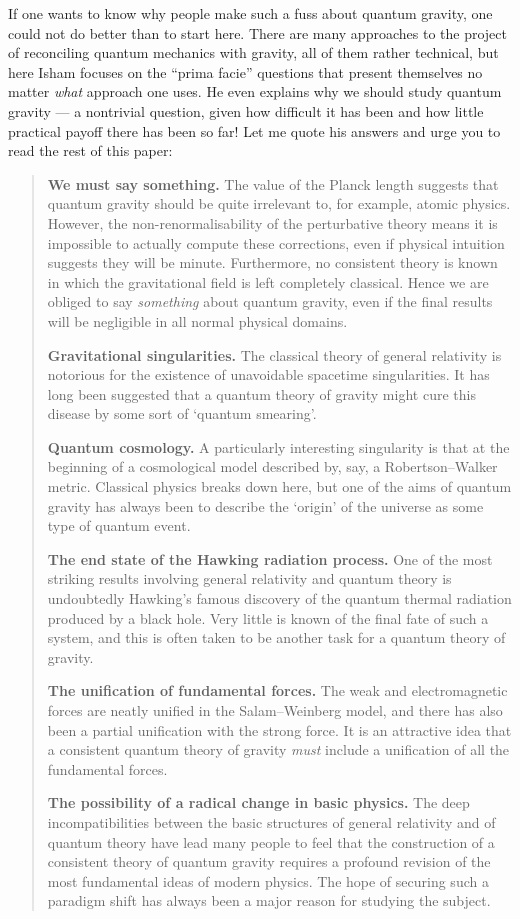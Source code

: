 \documentclass[12pt]{article}
\begin{document}
If one wants to know why people make such a fuss about quantum gravity,
one could not do better than to start here. There are many approaches to
the project of reconciling quantum mechanics with gravity, all of them
rather technical, but here Isham focuses on the ``prima facie''
questions that present themselves no matter \emph{what} approach one
uses. He even explains why we should study quantum gravity --- a
nontrivial question, given how difficult it has been and how little
practical payoff there has been so far! Let me quote his answers and
urge you to read the rest of this paper:

\begin{quote}

\textbf{We must say something.} The value of the Planck length suggests
that quantum gravity should be quite irrelevant to, for example, atomic
physics. However, the non-renormalisability of the perturbative theory
means it is impossible to actually compute these corrections, even if
physical intuition suggests they will be minute. Furthermore, no
consistent theory is known in which the gravitational field is left
completely classical. Hence we are obliged to say \emph{something} about
quantum gravity, even if the final results will be negligible in all
normal physical domains.

\textbf{Gravitational singularities.} The classical theory of general
relativity is notorious for the existence of unavoidable spacetime
singularities. It has long been suggested that a quantum theory of
gravity might cure this disease by some sort of `quantum smearing'.

\textbf{Quantum cosmology.} A particularly interesting singularity is
that at the beginning of a cosmological model described by, say, a
Robertson--Walker metric. Classical physics breaks down here, but one of
the aims of quantum gravity has always been to describe the `origin' of
the universe as some type of quantum event.

\textbf{The end state of the Hawking radiation process.} One of the most
striking results involving general relativity and quantum theory is
undoubtedly Hawking's famous discovery of the quantum thermal radiation
produced by a black hole. Very little is known of the final fate of such
a system, and this is often taken to be another task for a quantum
theory of gravity.

\textbf{The unification of fundamental forces.} The weak and
electromagnetic forces are neatly unified in the Salam--Weinberg model,
and there has also been a partial unification with the strong force. It
is an attractive idea that a consistent quantum theory of gravity
\emph{must} include a unification of all the fundamental forces.

\textbf{The possibility of a radical change in basic physics.} The deep
incompatibilities between the basic structures of general relativity and
of quantum theory have lead many people to feel that the construction of
a consistent theory of quantum gravity requires a profound revision of
the most fundamental ideas of modern physics. The hope of securing such
a paradigm shift has always been a major reason for studying the
subject.

\end{quote}
\end{document}
